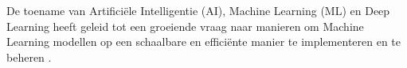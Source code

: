 
\chapter{}%
\label{ch:inleiding}


De toename van Artificiële Intelligentie (AI), Machine Learning (ML) en Deep Learning heeft geleid tot een groeiende vraag naar manieren om Machine Learning modellen op een schaalbare en efficiënte manier te implementeren en te beheren \autocite{Aggarwal2022}.\\

